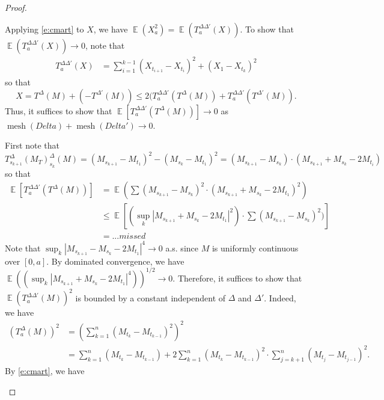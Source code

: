 \documentclass[11pt, a4paper]{memoir}
\theoremstyle{change}
\theoremstyle{plain}
\theoremstyle{nonumberplain}
\newtheorem{proof}{Proof}
\DeclareMathOperator{\E}{{\mathbb{E}}}
\DeclareMathOperator{\mesh}{mesh}
\numberwithin{equation}{section}
\begin{document}
\begin{proof}
\begin{enumerate}[nl]
            Applying \cref{e:cmart} to $X$, we have $\E(X_a^2)=\E(T_a^{\Delta\Delta'}(X))$.
            To show that $\E(T_a^{\Delta\Delta'}(X))\to 0$, note that
            \begin{align*}
                T_a^{\Delta\Delta'}(X) &= \sum_{i=1}^{k-1}(X_{t_{i+1}}-X_{t_i})^2+(X_1-X_{t_k})^2
            \end{align*}
            so that
            \begin{equation*}
                X=T^\Delta(M)+(-T^{\Delta'}(M))\leq 2(T_a^{\Delta\Delta'}(T^\Delta(M))+T_a^{\Delta\Delta'}(T^{\Delta'}(M)).
            \end{equation*}
            Thus, it suffices to show that $\E[T_a^{\Delta\Delta'}(T^\Delta(M))]\to 0$ as $\mesh(Delta)+\mesh(Delta')\to 0$.

            First note that
            \begin{equation*}
                T^\Delta_{s_{k+1}}(M_T)^\Delta_{s_k}(M) = (M_{s_{k+1}}-M_{t_1})^2-(M_{s_k}-M_{t_1})^2=(M_{s_{k+1}}-M_{s_k})\cdot(M_{s_{k+1}}+M_{s_k}-2M_{t_i})
            \end{equation*}
            so that
            \begin{align*}
                \E[T_a^{\Delta\Delta'}(T^\Delta(M))] &= \E(\sum(M_{s_{k+1}}-M_{s_k})^2\cdot(M_{s_{k+1}}+M_{s_k}-2M_{t_1})^2)\\
                                                     &\leq\E[(\sup_k|M_{s_{k+1}}+M_{s_k}-2M_{t_1}|^2)\cdot\sum(M_{s_{k+1}}-M_{s_k})^2)]\\
                                                     &= ...missed
            \end{align*}
            Note that $\sup_k|M_{s_{k+1}}-M_{s_k}-2M_{t_1}|^4\to 0$ a.s. since $M$ is uniformly continuous over $[0,a]$.
            By dominated convergence, we have $\E((\sup_k|M_{s_{k+1}}+M_{s_k}-2M_{t_1}|^4))^{1/2}\to 0$.
            Therefore, it suffices to show that $\E(T_a^{\Delta\Delta'}(M))^2$ is bounded by a constant independent of $\Delta$ and $\Delta'$.
            Indeed, we have
            \begin{align*}
                (T_a^\Delta(M))^2 &= \left(\sum_{k=1}^n(M_{t_k}-M_{t_{k-1}})^2\right)^2\\
                                  &= \sum_{k=1}^n (M_{t_k}-M_{t_{k-1}})+2\sum_{k=1}^n(M_{t_k}-M_{t_{k-1}})^2\cdot\sum_{j=k+1}^n(M_{t_j}-M_{t_{j-1}})^2.
            \end{align*}
            By \cref{e:cmart}, we have
            \begin{equation*}

\end{equation*}
\end{enumerate}
\end{proof}
\end{document}
